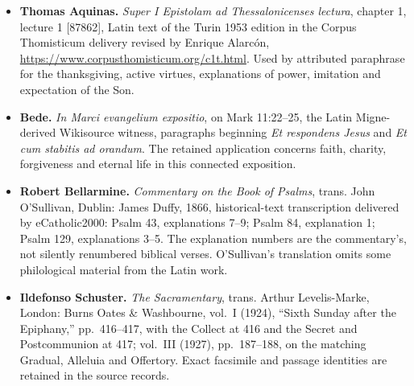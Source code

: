 \begin{itemize}
\item \textbf{Thomas Aquinas.}
\textit{Super I Epistolam ad Thessalonicenses lectura}, chapter 1, lecture 1 [87862], Latin text of the Turin 1953 edition in the Corpus Thomisticum delivery revised by Enrique Alarcón, \url{https://www.corpusthomisticum.org/c1t.html}. Used by attributed paraphrase for the thanksgiving, active virtues, explanations of power, imitation and expectation of the Son.

\item \textbf{Bede.}
\textit{In Marci evangelium expositio}, on Mark 11:22--25, the Latin Migne-derived Wikisource witness, paragraphs beginning \textit{Et respondens Jesus} and \textit{Et cum stabitis ad orandum}. The retained application concerns faith, charity, forgiveness and eternal life in this connected exposition.

\item \textbf{Robert Bellarmine.}
\textit{Commentary on the Book of Psalms}, trans. John O'Sullivan, Dublin: James Duffy, 1866, historical-text transcription delivered by eCatholic2000: Psalm 43, explanations 7--9; Psalm 84, explanation 1; Psalm 129, explanations 3--5. The explanation numbers are the commentary's, not silently renumbered biblical verses. O'Sullivan's translation omits some philological material from the Latin work.

\item \textbf{Ildefonso Schuster.}
\textit{The Sacramentary}, trans. Arthur Levelis-Marke, London: Burns Oates \& Washbourne, vol.~I (1924), ``Sixth Sunday after the Epiphany,'' pp.~416--417, with the Collect at 416 and the Secret and Postcommunion at 417; vol.~III (1927), pp.~187--188, on the matching Gradual, Alleluia and Offertory. Exact facsimile and passage identities are retained in the source records.
\end{itemize}
